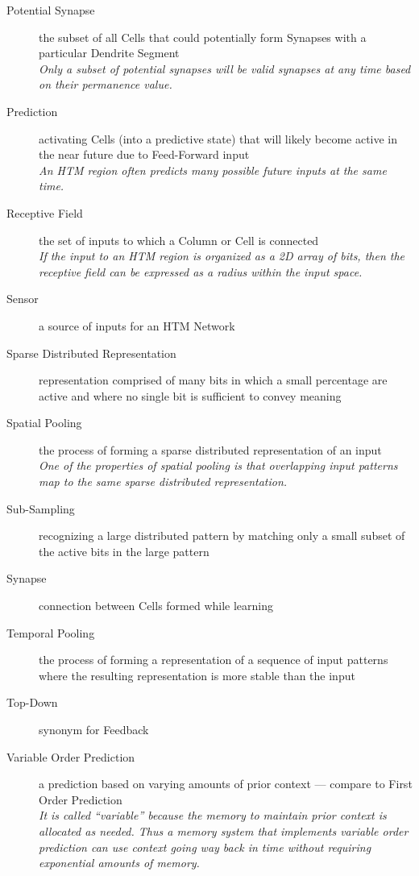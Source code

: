 \documentclass{report}
\begin{document}
\begin{description}
\item[Potential Synapse]{the subset of all Cells that could
  potentially form Synapses with a particular Dendrite Segment\\{\em
    Only a subset of potential synapses will be valid synapses at any
    time based on their permanence value.}}

\item[Prediction]{activating Cells (into a predictive state) that will
  likely become active in the near future due to Feed-Forward
  input\\{\em An HTM region often predicts many possible future inputs
    at the same time.}}

\item[Receptive Field]{the set of inputs to which a Column or Cell is
  connected\\{\em If the input to an HTM region is organized as a 2D
    array of bits, then the receptive field can be expressed as a
    radius within the input space.}}

\item[Sensor]{a source of inputs for an HTM Network}

\item[Sparse Distributed Representation]{representation comprised of
  many bits in which a small percentage are active and where no single
  bit is sufficient to convey meaning}

\item[Spatial Pooling]{the process of forming a sparse distributed
  representation of an input\\{\em One of the properties of spatial
    pooling is that overlapping input patterns map to the same sparse
    distributed representation.}}

\item[Sub-Sampling]{recognizing a large distributed pattern by
  matching only a small subset of the active bits in the large
  pattern}

\item[Synapse]{connection between Cells formed while learning}

\item[Temporal Pooling]{the process of forming a representation of a
  sequence of input patterns where the resulting representation is
  more stable than the input}

\item[Top-Down]{synonym for Feedback}

\item[Variable Order Prediction]{a prediction based on varying amounts
  of prior context --- compare to First Order Prediction\\{\em It is
    called ``variable'' because the memory to maintain prior context
    is allocated as needed. Thus a memory system that implements
    variable order prediction can use context going way back in time
    without requiring exponential amounts of memory.}}

\end{description}
\end{document}
